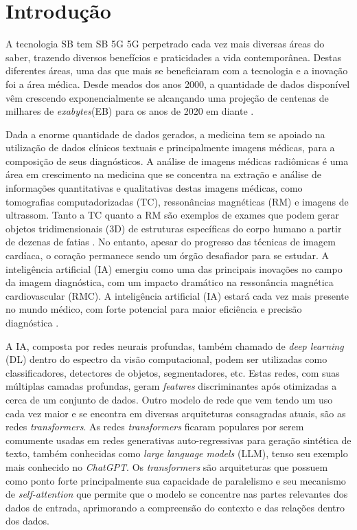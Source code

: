 \chapter{Introdução}
\label{chap:intro}

A tecnologia \gls{SB} tem \gls{SB} \gls{5G} \gls{5G} perpetrado cada vez mais diversas áreas do saber, trazendo diversos benefícios e praticidades a vida contemporânea. Destas diferentes áreas, uma das que mais se beneficiaram com a tecnologia e a inovação foi a área médica. Desde meados dos anos 2000, a quantidade de dados disponível vêm crescendo exponencialmente se alcançando uma projeção de centenas de milhares de \textit{exabytes}(EB) para os anos de 2020 em diante \cite{gantzDIGITALUNIVERSE2020}.

Dada a enorme quantidade de dados gerados, a medicina tem se apoiado na utilização de dados clínicos textuais e principalmente imagens médicas, para a composição de seus diagnósticos. A análise de imagens médicas radiômicas é uma área em crescimento na medicina que se concentra na extração e análise de informações quantitativas e qualitativas destas imagens médicas, como tomografias computadorizadas (TC), ressonâncias magnéticas (RM) e imagens de ultrassom. Tanto a TC quanto a RM são exemplos de exames que podem gerar objetos tridimensionais (3D) de estruturas específicas do corpo humano a partir de dezenas de fatias \cite{book:1355375}. No entanto, apesar do progresso das técnicas de imagem cardíaca, o coração permanece sendo um órgão desafiador para se estudar. A inteligência artificial (IA) emergiu como uma das principais inovações no campo da imagem diagnóstica, com um impacto dramático na ressonância magnética cardiovascular (RMC). A inteligência artificial (IA) estará cada vez mais presente no mundo médico, com forte potencial para maior eficiência e precisão diagnóstica \cite{argentieroApplicationsArtificialIntelligence2022}.

A IA, composta por redes neurais profundas, também chamado de \textit{deep learning} (DL) dentro do espectro da visão computacional, podem ser utilizadas como classificadores, detectores de objetos, segmentadores, etc. Estas redes, com suas múltiplas camadas profundas, geram \textit{features} discriminantes após otimizadas a cerca de um conjunto de dados. Outro modelo de rede que vem tendo um uso cada vez maior e se encontra em diversas arquiteturas consagradas atuais, são as redes \textit{transformers}. As redes \textit{transformers} ficaram populares por serem comumente usadas em redes generativas auto-regressivas para geração sintética de texto, também conhecidas como \textit{large language models} (LLM), tenso seu exemplo mais conhecido no \textit{ChatGPT}. Os \textit{transformers} são arquiteturas que possuem como ponto forte principalmente sua capacidade de paralelismo e seu mecanismo de \textit{self-attention} que permite que o modelo se concentre nas partes relevantes dos dados de entrada, aprimorando a compreensão do contexto e das relações dentro dos dados.


